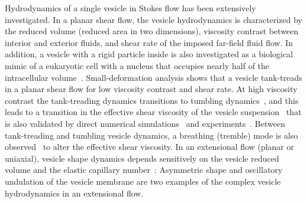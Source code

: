 \documentclass[prf,superscriptaddress,showkeys,longbibliography]{revtex4-1}
\begin{document}
Hydrodynamics of a single vesicle in Stokes flow has been extensively
investigated. In a planar shear flow, the vesicle hydrodynamics is
characterized by the reduced volume (reduced area in two dimensions),
viscosity contrast between interior and exterior fluids, and shear rate
of the imposed far-field fluid flow. In addition, a vesicle with a rigid
particle inside is also investigated as a biological mimic of a
eukaryotic cell with a nucleus that occupies nearly half of the
intracellular volume~\cite{Veerapaneni2011_PRL}. Small-deformation
analysis shows that a vesicle tank-treads in a planar shear flow for low
viscosity contrast and shear rate. At high viscosity contrast the
tank-treading dynamics transitions to tumbling
dynamics~\cite{Misbah2006_PRL, Vlahovska2007_PRE}, and this leads to a
transition in the effective shear viscosity of the vesicle
suspension~\cite{Misbah2006_PRL,Vitkova2008_BJ} that is also validated
by direct numerical simulations~\cite{GhigliottiBibenMisbah2010_JFM} and
experiments~\cite{Vitkova2008_BJ,DeschampsKantsler2009_PNAS,
KantslerSegreSteinberg2008_EPL, ZabuskySegreDeschamps2011_PoF}.  Between
tank-treading and tumbling vesicle dynamics, a breathing (tremble) mode
is also observed~\cite{Misbah2006_PRL, KantslerSegreSteinberg2008_PRL,
ZhaoShaqfeh2011_JFM, SpannZhaoShaqfeh2014_PoF} to alter the effective
shear viscosity.  In an extensional flow (planar or uniaxial), vesicle
shape dynamics depends sensitively on the vesicle reduced volume and the
elastic capillary number~\cite{KantslerSegreSteinberg2008_PRL,
ZhaoShaqfeh2013_JFM, Narsimhan2014_JFM,
DahlNarsimhanGouveia2016_SoftMatt}: Asymmetric shape and oscillatory
undulation of the vesicle membrane are two examples of the complex
vesicle hydrodynamics in an extensional flow.
\end{document}

